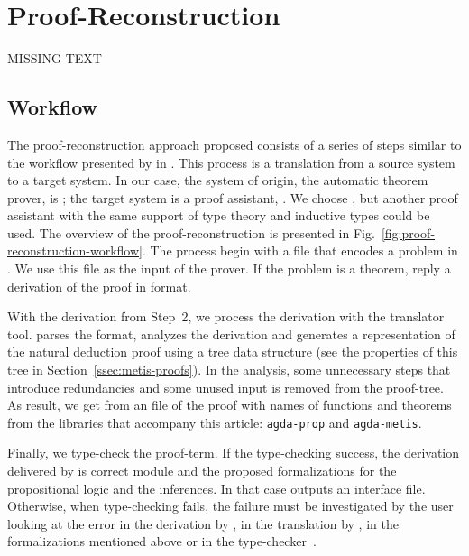 \documentclass[../main.tex]{subfiles}
\begin{document}

\section{Proof-Reconstruction}
\label{sec:proof-reconstruction}

MISSING TEXT

\subsection{Workflow}
\label{ssec:workflow}



The proof-reconstruction approach proposed consists of a series
of steps similar to the workflow presented by \citeauthor{sultana2015} in
\cite{sultana2015}. This process is a translation from a source
system to a target system. In our case, the system of origin, the
automatic theorem prover, is \Metis; the target system is a proof
assistant, \Agda. We choose \Agda, but another proof assistant with the
same support of type theory and inductive types could be used.
The overview of the proof-reconstruction is presented in
Fig.~\ref{fig:proof-reconstruction-workflow}. The process begin with
a \TPTP file that encodes a problem in \CPL. We use this file as the
input of the \Metis prover. If the problem is a theorem, \Metis
reply a derivation of the proof in \TSTP format.

With the \TSTP derivation from Step~2, we process the derivation with the
\Athena translator tool.
\Athena parses the \TSTP format, analyzes the
derivation and generates a representation of the natural deduction
proof using a tree data structure (see the properties
of this tree in Section~\ref{ssec:metis-proofs}).
In the \Athena analysis, some unnecessary steps that introduce redundancies
and some unused input is removed from the proof-tree.
As result, we get from \Athena an \Agda file of the proof
with names of functions and theorems from
the \Agda libraries that accompany this article:
\texttt{agda-prop} and \texttt{agda-metis}.

Finally, we type-check the \Agda proof-term. If the type-checking
success, the \TSTP derivation delivered by \Metis is correct
module \Agda and the proposed formalizations for the
propositional logic and the \Metis inferences.
In that case \Agda outputs an interface file.
Otherwise, when type-checking fails, the failure must be
investigated by the user looking at the error in the \TSTP derivation
by \Metis, in the translation by \Athena, in the \Agda formalizations
mentioned above or in the type-checker~\Agda.
\end{document}
